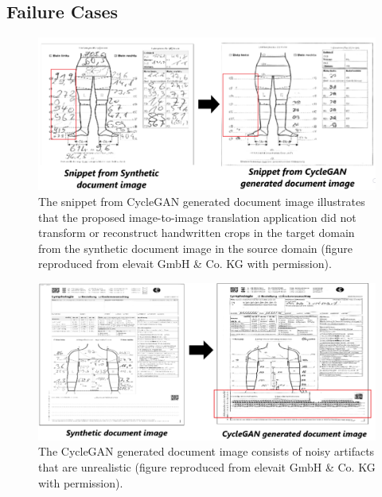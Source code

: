 \subsection{Failure Cases}\label{FailureCases}

\begin{figure}[H]
        \begin{center}
	    \includegraphics[scale=0.29]{images/Evaluation/failure1.png}
	    \caption[The snippet from \ac{CycleGAN} generated document image illustrates that the proposed image-to-image translation application did not transform or reconstruct handwritten crops in the target domain from the synthetic document image in the source domain.]{The snippet from \ac{CycleGAN} generated document image illustrates that the proposed image-to-image translation application did not transform or reconstruct handwritten crops in the target domain from the synthetic document image in the source domain (figure reproduced from elevait GmbH \& Co. KG with permission).}
	    \label{fig:failure1}
	    \end{center}
\end{figure}

\begin{figure}[H]
        \begin{center}
	    \includegraphics[scale=0.50]{images/Evaluation/failure2.png}
	    \caption[The \ac{CycleGAN} generated document image consists of noisy artifacts that are unrealistic.]{The \ac{CycleGAN} generated document image consists of noisy artifacts that are unrealistic (figure reproduced from elevait GmbH \& Co. KG with permission).}
	    \label{fig:failure2}
	    \end{center}
\end{figure}

